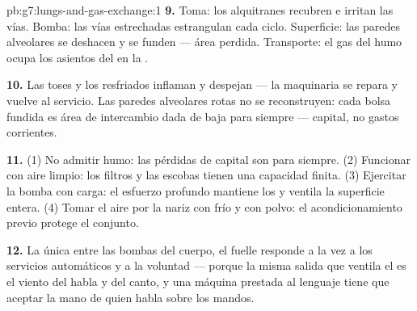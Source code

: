\begin{solution}{pb:g7:lungs-and-gas-exchange:1}
\textbf{9.} Toma: los alquitranes recubren e irritan las vías. Bomba:
las vías estrechadas estrangulan cada ciclo. Superficie: las paredes
alveolares se deshacen y se funden --- área perdida. Transporte: el gas
del humo ocupa los asientos del  en la .

\textbf{10.} Las toses y los resfriados inflaman y despejan --- la
maquinaria se repara y vuelve al servicio. Las paredes alveolares rotas
no se reconstruyen: cada bolsa fundida es área de intercambio dada de
baja para siempre --- capital, no gastos corrientes.

\textbf{11.} (1) No admitir humo: las pérdidas de capital son para
siempre. (2) Funcionar con aire limpio: los filtros y las escobas
tienen una capacidad finita. (3) Ejercitar la bomba con carga: el
esfuerzo profundo mantiene los  y ventila la superficie
entera. (4) Tomar el aire por la nariz con frío y con polvo: el
acondicionamiento previo protege el conjunto.

\textbf{12.} La única entre las bombas del cuerpo, el fuelle responde a
la vez a los servicios automáticos y a la voluntad --- porque la misma
salida que ventila el  es el viento del habla y del
canto, y una máquina prestada al lenguaje tiene que aceptar la mano de
quien habla sobre los mandos.
\end{solution}
